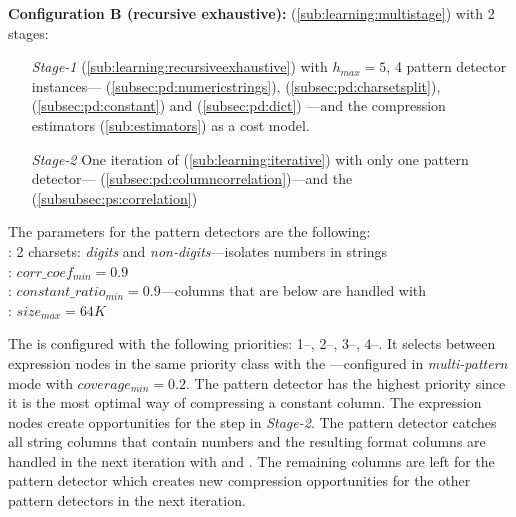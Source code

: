 \vspace{0.5em}
\noindent\textbf{Configuration B (recursive exhaustive):}  (\ref{sub:learning:multistage}) with 2 stages:
\begin{enumerate}[nosep]
    \item[\textit{Stage-1}]  (\ref{sub:learning:recursiveexhaustive}) with \(h_{max} = 5\), 4 pattern detector instances---
     (\ref{subsec:pd:numericstrings}), 
     (\ref{subsec:pd:charsetsplit}), 
     (\ref{subsec:pd:constant}) and 
     (\ref{subsec:pd:dict})
    ---and the compression estimators (\ref{sub:estimators}) as a cost model.
    \item[\textit{Stage-2}] One iteration of  (\ref{sub:learning:iterative}) with only one pattern detector---     (\ref{subsec:pd:columncorrelation})---and the  (\ref{subsubsec:ps:correlation})
\end{enumerate}

\vspace{0.5em}
The parameters for the pattern detectors are the following:\\
: 2 charsets: \textit{digits} and \textit{non-digits}---isolates numbers in strings\\
: \(corr\_coef_{min} = 0.9\)\\
: \(constant\_ratio_{min} = 0.9\)---columns that are below are handled with \\
: \(size_{max} = 64K\)

The  is configured with the following priorities: 1--, 2--, 3--, 4--.
It selects between expression nodes in the same priority class with the ---configured in \textit{multi-pattern} mode with \(coverage_{min} = 0.2\). The  pattern detector has the highest priority since it is the most optimal way of compressing a constant column. The  expression nodes create opportunities for the   step in \textit{Stage-2}. The  pattern detector catches all string columns that contain numbers and the resulting format columns are handled in the next iteration with  and . The remaining columns are left for the  pattern detector which creates new compression opportunities for the other pattern detectors in the next iteration.

